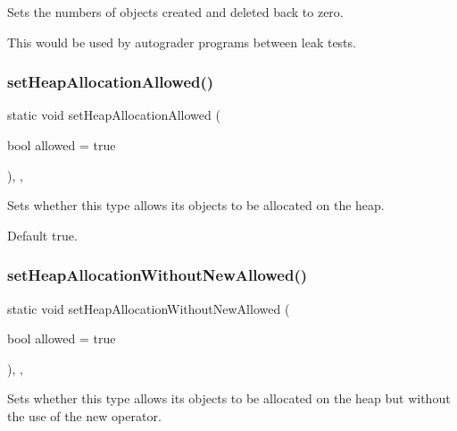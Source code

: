 Sets the numbers of objects created and deleted back to zero. 

This would be used by autograder programs between leak tests. \mbox{\label{classManaged_a63f381f9b36ca3cfb6ff93de9deb8d4c}} 
\subsubsection{\texorpdfstring{set\+Heap\+Allocation\+Allowed()}{setHeapAllocationAllowed()}}
{\footnotesize\ttfamily static void set\+Heap\+Allocation\+Allowed (\begin{DoxyParamCaption}\item[{bool}]{allowed = {\ttfamily true} }\end{DoxyParamCaption})\hspace{0.3cm}{\ttfamily [inline]}, {\ttfamily [static]}, {\ttfamily [protected]}}



Sets whether this type allows its objects to be allocated on the heap. 

Default true. \mbox{\label{classManaged_a51650b1dc51e20f1c7e846883a0d9467}} 
\subsubsection{\texorpdfstring{set\+Heap\+Allocation\+Without\+New\+Allowed()}{setHeapAllocationWithoutNewAllowed()}}
{\footnotesize\ttfamily static void set\+Heap\+Allocation\+Without\+New\+Allowed (\begin{DoxyParamCaption}\item[{bool}]{allowed = {\ttfamily true} }\end{DoxyParamCaption})\hspace{0.3cm}{\ttfamily [inline]}, {\ttfamily [static]}, {\ttfamily [protected]}}



Sets whether this type allows its objects to be allocated on the heap but without the use of the \textquotesingle{}new\textquotesingle{} operator. 

